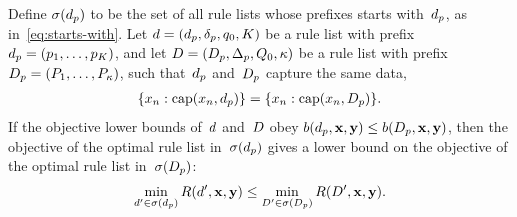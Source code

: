 \begin{theorem}
\label{thm:equivalent}
Define $\sigma(d_p)$ to be the set of all rule lists
whose prefixes starts with~$d_p$, as in~\eqref{eq:starts-with}.
%
Let ${{d} = (d_p, \delta_p, q_0, K)}$
be a rule list with prefix ${d_p = (p_1, \dots, p_K)}$,
and let ${{D} = (D_p, \Delta_p, Q_0, \kappa)}$
be a rule list with prefix ${D_p = (P_1, \dots, P_{\kappa})}$,
such that~$d_p$ and~$D_p$ capture the same data,~\ie
\begin{align}
\{x_n : \textnormal{cap}(x_n, d_p)\} = \{x_n : \textnormal{cap}(x_n, D_p)\}.
\end{align}
%
If the objective lower bounds of~${d}$ and~${D}$
obey ${b(d_p, \mathbf{x}, \mathbf{y}) \le b(D_p, \mathbf{x}, \mathbf{y})}$,
then the objective of the optimal rule list in~$\sigma(d_p)$ gives a
lower bound on the objective of the optimal rule list in~$\sigma(D_p)$:
\begin{align}
\min_{{d}' \in \sigma(d_p)} R({d}', \mathbf{x}, \mathbf{y})
\le \min_{{D}' \in \sigma(D_p)} R({D}', \mathbf{x}, \mathbf{y}).
\label{eq:permutation}
\end{align}
\end{theorem}

